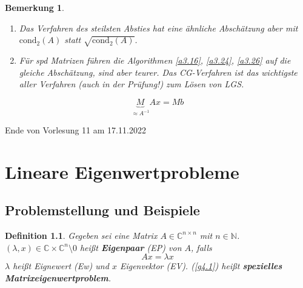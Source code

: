 \documentclass{book}
\newtheorem{definition}[algorithm]{Definition}
\newtheorem{remark}[algorithm]{Bemerkung}
\def\C{\mathbb{C}}
\def\N{\mathbb{N}}
\def\cond{\text{cond}}
\begin{document}
            \begin{remark}\label{b3.39}
                \begin{enumerate}
                    \item Das Verfahren des steilsten Absties hat eine ähnliche Abschätzung aber mit $\cond_2(A)$ statt $\sqrt{\cond_2(A)}$.
                    \item Für spd Matrizen führen die Algorithmen \ref{a3.16}, \ref{a3.24}, \ref{a3.26} auf die gleiche Abschätzung, sind aber teurer. Das 
                    CG-Verfahren ist das wichtigste aller Verfahren (auch in der Prüfung!) zum Lösen von LGS. 
                \end{enumerate}
            \end{remark}

            $$\underbrace{M}_{\approx A^{-1}}Ax=Mb$$ %

            \noindent
            \xrfill[0.7ex]{1pt}Ende von Vorlesung 11 am 17.11.2022\xrfill[0.7ex]{1pt}
            
    \chapter{Lineare Eigenwertprobleme}

        \section{Problemstellung und Beispiele}

            \begin{definition}\label{d4.1}
                Gegeben sei eine Matrix $A\in\C^{n\times n}$ mit $n\in\N$. $(\lambda,x)\in\C\times \C^n\setminus{0}$ heißt 
                \textbf{Eigenpaar} (EP) von $A$, falls 
                \begin{equation}\label{g4.1}
                    Ax=\lambda x
                \end{equation}
                $\lambda$ heißt Eignewert (Ew) und $x$ Eigenvektor (EV). (\ref{g4.1}) heißt \textbf{spezielles Matrixeigenwertproblem}.
            \end{definition}
\end{document}
